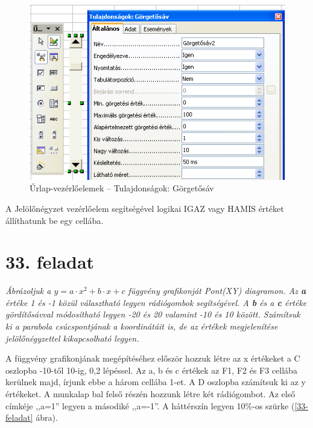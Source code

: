 \begin{figure}[!h]
\begin{center}
\includegraphics[width=12.253cm]{oocalcv1-img151.png}
\caption{Űrlap-vezérlőelemek --  Tulajdonságok: Görgetősáv}\label{Görgetősáv}
\end{center}
\end{figure}

A Jelölőnégyzet vezérlőelem segítségével logikai
IGAZ vagy HAMIS értéket állíthatunk be egy cellába.


\section{33. feladat}

{\itshape
Ábrázoljuk a  $y=a\cdot x^{2}+b\cdot x+c$ függvény grafikonját
Pont(XY) diagramon. Az \textbf{a} értéke 1 és -1 közül
választható legyen rádiógombok segítségével. A \textbf{b}
és a \textbf{c} értéke gördítősávval módosítható
legyen -20 és 20 valamint -10 és 10 között. Számítsuk ki a
parabola csúcspontjának a koordinátáit is, de az értékek
megjelenítése jelölőnégyzettel kikapcsolható legyen.}

A függvény grafikonjának megépítéséhez először
hozzuk létre az x értékeket a C oszlopba -10-től 10-ig, 0,2
lépéssel. Az a, b és c értékek az F1, F2 és F3 cellába
kerülnek majd, írjunk ebbe a három cellába 1-et. A D oszlopba
számítsuk ki az y értékeket. A munkalap bal felső
részén hozzunk létre két rádiógombot. Az első
címkéje ,,a=1'' legyen a másodiké ,,a=-1''. A
háttérszín legyen 10\%-os szürke (\ref{33-feladat} ábra).

